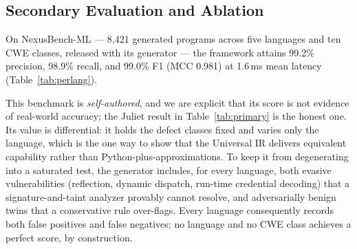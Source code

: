 \documentclass[10pt,conference]{IEEEtran}
\begin{document}
\subsection{Secondary Evaluation and Ablation}
\label{sec:ablation}
On NexusBench-ML --- 8{,}421 generated programs across five languages and ten
CWE classes, released with its generator --- the framework attains 99.2\%
precision, 98.9\% recall, and 99.0\% F1 (MCC 0.981) at 1.6\,ms mean latency
(Table~\ref{tab:perlang}).

This benchmark is \emph{self-authored}, and we are explicit that its score is
not evidence of real-world accuracy; the Juliet result in
Table~\ref{tab:primary} is the honest one. Its value is differential: it holds
the defect classes fixed and varies only the language, which is the one way to
show that the Universal IR delivers equivalent capability rather than
Python-plus-approximations. To keep it from degenerating into a saturated
test, the generator includes, for every language, both evasive vulnerabilities
(reflection, dynamic dispatch, run-time credential decoding) that a
signature-and-taint analyzer provably cannot resolve, and adversarially benign
twins that a conservative rule over-flags. Every language consequently records
both false positives and false negatives; no language and no CWE class
achieves a perfect score, by construction.

\begin{table}[t]
\centering
\caption{Per-language results on NexusBench-ML (8{,}421 generated programs).
Language parity is the property this benchmark isolates; the residual errors
are the planted evasive and adversarial cases.}
\label{tab:perlang}
\end{table}
\end{document}
